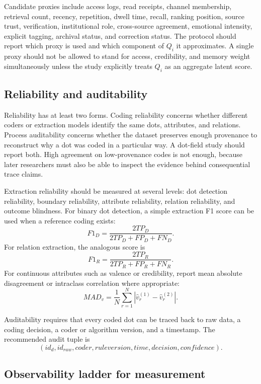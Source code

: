 \documentclass[11pt]{article}
\theoremstyle{remark}
\begin{document}
Candidate proxies include access logs, read receipts, channel membership,
retrieval count, recency, repetition, dwell time, recall, ranking
position, source trust, verification, institutional role, cross-source
agreement, emotional intensity, explicit tagging, archival status, and
correction status. The protocol should report which proxy is used and
which component of \(Q_i\) it approximates. A single proxy should not be
allowed to stand for access, credibility, and memory weight
simultaneously unless the study explicitly treats \(Q_i\) as an aggregate
latent score.

\subsection{Reliability and auditability}\label{reliability-auditability-measurement}

Reliability has at least two forms. Coding reliability concerns whether different coders or extraction models identify the same dots, attributes, and relations. Process auditability concerns whether the dataset preserves enough provenance to reconstruct why a dot was coded in a particular way. A dot-field study should report both. High agreement on low-provenance codes is not enough, because later researchers must also be able to inspect the evidence behind consequential trace claims.


Extraction reliability should be measured at several levels: dot
detection reliability, boundary reliability, attribute reliability,
relation reliability, and outcome blindness. For binary dot detection, a
simple extraction F1 score can be used when a reference coding exists:
\[
F1_D=\frac{2TP_D}{2TP_D+FP_D+FN_D}.
\]
For relation extraction, the analogous score is
\[
F1_R=\frac{2TP_R}{2TP_R+FP_R+FN_R}.
\]
For continuous attributes such as valence or credibility, report mean
absolute disagreement or intraclass correlation where appropriate:
\[
MAD_v=\frac{1}{N}\sum_{r=1}^N|\widehat v_r^{(1)}-\widehat v_r^{(2)}|.
\]

Auditability requires that every coded dot can be traced back to raw data,
a coding decision, a coder or algorithm version, and a timestamp. The
recommended audit tuple is
\[
(id_d,id_{raw},coder,ruleversion,time,decision,confidence).
\]

\subsection{Observability ladder for measurement}\label{observability-ladder-measurement}
\end{document}
